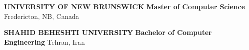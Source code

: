 \begin{cventries}
    \cventry
    {\textbf {UNIVERSITY OF NEW BRUNSWICK}}
    {\textbf {Master of Computer Science}}
    {Fredericton, NB, Canada}
    {}
    {}
    
    \vspace{0.4 cm}

    \cventry
    {\textbf {SHAHID BEHESHTI UNIVERSITY}}
    {\textbf {Bachelor of Computer Engineering}}
    {Tehran, Iran}
    {}
    {}
    
\end{cventries}